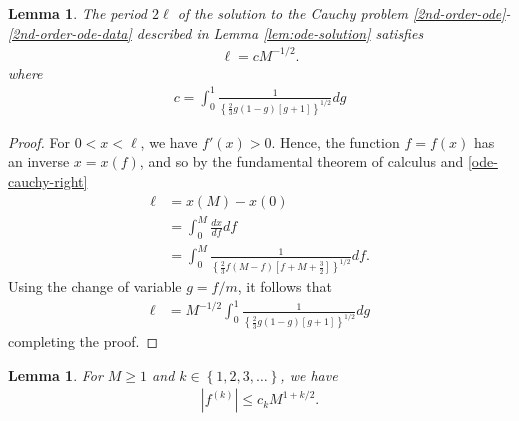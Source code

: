 \documentclass[12pt,reqno]{amsart}
\numberwithin{equation}{section}  %
\newtheorem{lemma}[theorem]{Lemma}
\begin{document}
%
%
%
%
%
%
%
%
%
%
%
\begin{lemma}
  The period $2 \ell$ of the solution to the Cauchy problem
  \eqref{2nd-order-ode}-\eqref{2nd-order-ode-data} described in Lemma
  \ref{lem:ode-solution} satisfies
  \begin{equation}
  \begin{split}
    \ell = c M^{-1/2}.
  \end{split}
  \label{period-est}
  \end{equation}
  where
  \begin{equation}
  \begin{split}
 c =  \int_{0}^{1} \frac{1}{ \left\{ \frac{2}{3}g(1-g)
\left[ g + 1 \right] \right\}^{1/2}} dg
  \end{split}
  \label{constant-val}
  \end{equation}
\label{lem:period-est}
\end{lemma}
%
%
%
%
\begin{proof}
For $0 < x < \ell$, we have $f'(x) > 0$. Hence, the function $f = f(x)$ has an
inverse $x = x(f)$, and so by the fundamental theorem of calculus and
\eqref{ode-cauchy-right}
%
%
\begin{equation*}
\begin{split}
\ell & = x(M) - x(0)
\\
& = \int_{0}^{M} \frac{dx}{df} df
\\
& = \int_{0}^{M} \frac{1}{ \left\{ \frac{2}{3}f(M-f)
\left[ f + M + \frac{3}{2}\right] \right\}^{1/2}} df.
\end{split}
\end{equation*}
%
Using the change of variable $g = f/m$, it follows that 
%
%
%
\begin{equation*}
\begin{split}
\ell & =  M^{-1/2} \int_{0}^{1} \frac{1}{ \left\{ \frac{2}{3}g(1-g)
\left[ g + 1 \right] \right\}^{1/2}} dg
\end{split}
\end{equation*}
%
%
completing the proof.
\end{proof}
%
%
%
%
%
%
%
%
%
\begin{lemma}
  For $M \ge 1$ and $k \in \left\{ 1,2,3,\dots \right\}$, we have
%
%
\begin{equation}
\begin{split}
  | f^{(k)} | \le c_{k} M^{1 + k/2}.
\end{split}
\label{eqn:deriv-bound}
\end{equation}
%
%
\label{lem:deriv-bound}
\end{lemma}
\end{document}
